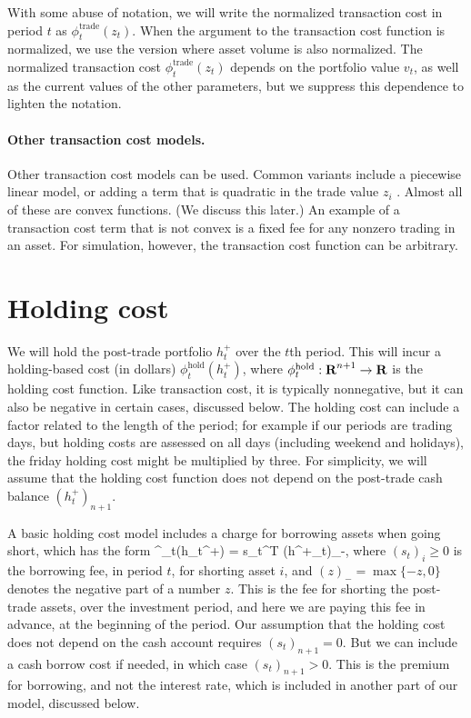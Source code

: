\documentclass[openany]{now}
\newcommand{\trcost}{\phi^\mathrm{trade}}
\newcommand{\hldcost}{\phi^\mathrm{hold}}
\begin{document}
With some abuse of notation, we will write the normalized transaction cost
in period $t$ as $\trcost_t(z_t)$.  When the argument to the transaction cost
function is normalized, we use the version where asset volume is also normalized.
The normalized transaction cost $\trcost_t(z_t)$ depends on the portfolio value
$v_t$, as well as the current values of the other parameters,
but we suppress this dependence to lighten the notation.

\paragraph{Other transaction cost models.}
Other transaction cost models can be used.  Common variants include
a piecewise linear model, or adding a term that is quadratic in the trade value $z_i$
\cite{almgren2001optimal,grinold2006dynamic,garleanu2013dynamic}.
Almost all of these are convex functions. (We discuss this later.)
An example of a transaction cost term that is not convex is
a fixed fee for any nonzero trading in an asset.
For simulation, however, the transaction cost function can be arbitrary.

\section{Holding cost}
We will hold the post-trade portfolio $h_t^+$ over the $t$th period.
This will incur a holding-based cost (in dollars) $\hldcost_t(h_t^+)$,
where $\hldcost_t:\reals^{n+1} \to \reals$ is the holding cost function.
Like transaction cost, it is typically nonnegative, but it can also be
negative in certain cases, discussed below.
The holding cost can include a factor related to the length of the period;
for example if our periods are trading days, but holding costs are assessed on
all days (including weekend and holidays), the friday holding cost might be
multiplied by three.
For simplicity, we will assume that the holding cost function
does not depend on the post-trade cash balance $(h_t^+)_{n+1}$.

A basic holding cost model includes
a charge for borrowing assets when going short, which has the form
\BEQ\label{e-hld-cost}
\hldcost_t(h_t^+) =  s_t^T (h^+_t)_-,
\EEQ
where $(s_t)_i \geq 0$ is the borrowing fee,
in period $t$, for shorting asset $i$,
and $(z)_- =\max\{-z,0\}$ denotes the negative part of a number $z$.
This is the fee for shorting
the post-trade assets, over the investment period, and here we are paying this
fee in advance, at the beginning of the period.
Our assumption that the holding cost does not depend on the cash account
requires $(s_t)_{n+1} =0$.  But we can include a cash borrow cost if needed,
in which case $(s_t)_{n+1}>0$.  This is the premium for borrowing, and not
the interest rate, which is included in another part of our model,
discussed below.
\end{document}
